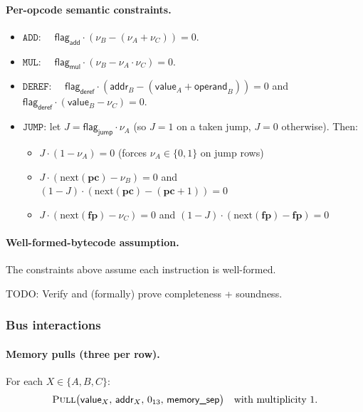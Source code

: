 \documentclass{article}
\theoremstyle{definition}
\begin{document}
\paragraph{Per-opcode semantic constraints.}
\begin{itemize}
    \item $\texttt{ADD}$: $\quad \textsf{flag}_\textsf{add} \cdot (\nu_B - (\nu_A + \nu_C)) = 0$.
    \item $\texttt{MUL}$: $\quad \textsf{flag}_\textsf{mul} \cdot (\nu_B - \nu_A \cdot \nu_C) = 0$.
    \item $\texttt{DEREF}$: $\quad \textsf{flag}_\textsf{deref} \cdot (\textsf{addr}_B - (\textsf{value}_A + \textsf{operand}_B)) = 0$ \quad and \quad $\textsf{flag}_\textsf{deref} \cdot (\textsf{value}_B - \nu_C) = 0$.
    \item $\texttt{JUMP}$: let $J = \textsf{flag}_\textsf{jump} \cdot \nu_A$ (so $J = 1$ on a taken jump, $J = 0$ otherwise). Then:
    \begin{itemize}
        \item $J \cdot (1 - \nu_A) = 0$ \quad (forces $\nu_A \in \{0, 1\}$ on jump rows)
        \item $J \cdot (\text{next}(\textbf{pc}) - \nu_B) = 0$ \quad and \quad $(1 - J) \cdot (\text{next}(\textbf{pc}) - (\textbf{pc} + 1)) = 0$
        \item $J \cdot (\text{next}(\textbf{fp}) - \nu_C) = 0$ \quad and \quad $(1 - J) \cdot (\text{next}(\textbf{fp}) - \textbf{fp}) = 0$
    \end{itemize}
\end{itemize}

\paragraph{Well-formed-bytecode assumption.} The constraints above assume each instruction is well-formed.

TODO: Verify and (formally) prove completeness + soundness.

\subsubsection{Bus interactions}\label{sec:execution-bus}

\paragraph{Memory pulls (three per row).} For each $X \in \{A, B, C\}$:
\[
\textsc{Pull}\big(\textsf{value}_X,\, \textsf{addr}_X,\, 0_{13},\, \textsf{memory\_sep}\big) \quad \text{with multiplicity } 1.
\]
\end{document}
